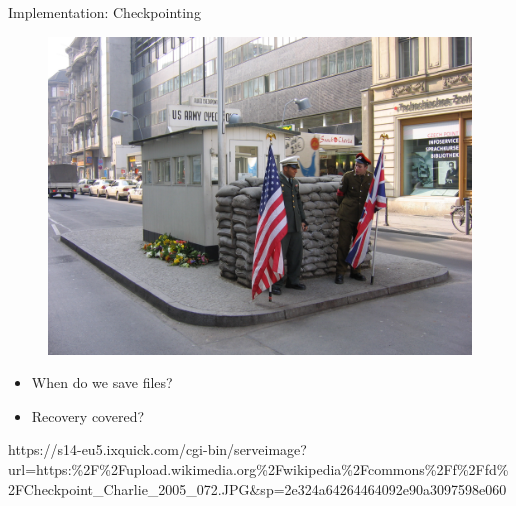 \documentclass[shortpres]{beamer}
\newcommand{\imgcolscale}{0.9}
\begin{document}
\begin{frame}{Implementation: Checkpointing}
	\begin{multicols}{2}
		\begin{figure}
			\includegraphics[width=\imgcolscale\linewidth]{img/checkpointcharlie.jpeg}
		\end{figure}
		
	\columnbreak
	
		\begin{itemize}
			\item When do we save files?
			\item Recovery covered?
		\end{itemize}
\end{multicols}		
	
	\vfill
	\flushleft
	{\fontsize{3.5}{3.5} \selectfont 
	https://s14-eu5.ixquick.com/cgi-bin/serveimage?url=https:\%2F\%2Fupload.wikimedia.org\%2Fwikipedia\%2Fcommons\%2Ff\%2Ffd\%2FCheckpoint\_Charlie\_2005\_072.JPG\&sp=2e324a64264464092e90a3097598e060}
\end{frame}
\end{document}
